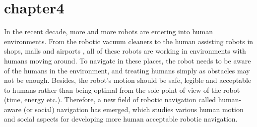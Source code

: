 \section{chapter4}

In the recent decade, more and more robots are entering into human environments. From the robotic vacuum cleaners to the human assisting robots in shops, malls \cite{kanda2009affective, foster2019mummer} and airports \cite{triebel2016spencer}, all of these robots are working in environments with humans moving around. To navigate in these places, the robot needs to be aware of the humans in the environment, and treating humans simply as obstacles may not be enough. Besides, the robot's motion should be safe, legible and acceptable to humans rather than being optimal from the sole point of view of the robot (time, energy etc.). Therefore, a new field of robotic navigation called human-aware (or social) navigation has emerged, which studies various human motion and social aspects for developing more human acceptable robotic navigation. 


